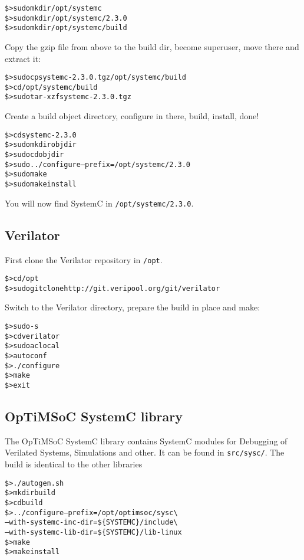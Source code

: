 \begin{alltt}
\$> sudo mkdir /opt/systemc
\$> sudo mkdir /opt/systemc/2.3.0
\$> sudo mkdir /opt/systemc/build
\end{alltt}

Copy the gzip file from above to the build dir, become superuser, move
there and extract it:

\begin{alltt}
\$> sudo cp systemc-2.3.0.tgz /opt/systemc/build
\$> cd /opt/systemc/build
\$> sudo tar -xzf systemc-2.3.0.tgz
\end{alltt}

Create a build object directory, configure in there, build, install,
done!

\begin{alltt}
\$> cd systemc-2.3.0
\$> sudo mkdir objdir
\$> sudo cd objdir
\$> sudo ../configure --prefix=/opt/systemc/2.3.0
\$> sudo make
\$> sudo make install
\end{alltt}

You will now find SystemC in \verb|/opt/systemc/2.3.0|.

\subsection{Verilator}

First clone the Verilator repository in \verb|/opt|.

\begin{alltt}
\$> cd /opt
\$> sudo git clone http://git.veripool.org/git/verilator
\end{alltt}

Switch to the Verilator directory, prepare the build in place and make:

\begin{alltt}
\$> sudo -s
\$> cd verilator
\$> sudo aclocal
\$> autoconf
\$> ./configure
\$> make
\$> exit
\end{alltt}

\subsection{OpTiMSoC SystemC library}

The OpTiMSoC SystemC library contains SystemC modules for Debugging of
Verilated Systems, Simulations and other. It can be found in
\verb|src/sysc/|. The build is identical to the other libraries

\begin{alltt}
\$> ./autogen.sh
\$> mkdir build
\$> cd build
\$> ../configure --prefix=/opt/optimsoc/sysc \textbackslash
      --with-systemc-inc-dir=\$\{SYSTEMC\}/include \textbackslash
      --with-systemc-lib-dir=\$\{SYSTEMC\}/lib-linux
\$> make
\$> make install
\end{alltt}

